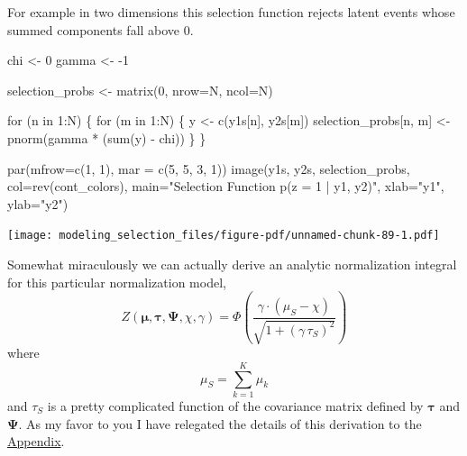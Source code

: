 \documentclass[
  letterpaper,
  DIV=11,
  numbers=noendperiod]{scrartcl}
\newenvironment{Shaded}{\begin{snugshade}}{\end{snugshade}}
\newcommand{\AttributeTok}[1]{\textcolor[rgb]{0.40,0.45,0.13}{#1}}
\newcommand{\ControlFlowTok}[1]{\textcolor[rgb]{0.00,0.23,0.31}{#1}}
\newcommand{\DecValTok}[1]{\textcolor[rgb]{0.68,0.00,0.00}{#1}}
\newcommand{\FunctionTok}[1]{\textcolor[rgb]{0.28,0.35,0.67}{#1}}
\newcommand{\NormalTok}[1]{\textcolor[rgb]{0.00,0.23,0.31}{#1}}
\newcommand{\OtherTok}[1]{\textcolor[rgb]{0.00,0.23,0.31}{#1}}
\newcommand{\SpecialCharTok}[1]{\textcolor[rgb]{0.37,0.37,0.37}{#1}}
\newcommand{\StringTok}[1]{\textcolor[rgb]{0.13,0.47,0.30}{#1}}
\begin{document}
For example in two dimensions this selection function rejects latent
events whose summed components fall above \(0\).

\begin{Shaded}
\begin{Highlighting}[]
\NormalTok{chi }\OtherTok{\textless{}{-}} \DecValTok{0}
\NormalTok{gamma }\OtherTok{\textless{}{-}} \SpecialCharTok{{-}}\DecValTok{1}

\NormalTok{selection\_probs }\OtherTok{\textless{}{-}} \FunctionTok{matrix}\NormalTok{(}\DecValTok{0}\NormalTok{, }\AttributeTok{nrow=}\NormalTok{N, }\AttributeTok{ncol=}\NormalTok{N)}

\ControlFlowTok{for}\NormalTok{ (n }\ControlFlowTok{in} \DecValTok{1}\SpecialCharTok{:}\NormalTok{N) \{}
  \ControlFlowTok{for}\NormalTok{ (m }\ControlFlowTok{in} \DecValTok{1}\SpecialCharTok{:}\NormalTok{N) \{}
\NormalTok{    y }\OtherTok{\textless{}{-}} \FunctionTok{c}\NormalTok{(y1s[n], y2s[m])}
\NormalTok{    selection\_probs[n, m] }\OtherTok{\textless{}{-}} \FunctionTok{pnorm}\NormalTok{(gamma }\SpecialCharTok{*}\NormalTok{ (}\FunctionTok{sum}\NormalTok{(y) }\SpecialCharTok{{-}}\NormalTok{ chi))}
\NormalTok{  \}}
\NormalTok{\}}

\FunctionTok{par}\NormalTok{(}\AttributeTok{mfrow=}\FunctionTok{c}\NormalTok{(}\DecValTok{1}\NormalTok{, }\DecValTok{1}\NormalTok{), }\AttributeTok{mar =} \FunctionTok{c}\NormalTok{(}\DecValTok{5}\NormalTok{, }\DecValTok{5}\NormalTok{, }\DecValTok{3}\NormalTok{, }\DecValTok{1}\NormalTok{))}
\FunctionTok{image}\NormalTok{(y1s, y2s, selection\_probs, }\AttributeTok{col=}\FunctionTok{rev}\NormalTok{(cont\_colors),}
      \AttributeTok{main=}\StringTok{"Selection Function p(z = 1 | y1, y2)"}\NormalTok{,}
      \AttributeTok{xlab=}\StringTok{"y1"}\NormalTok{, }\AttributeTok{ylab=}\StringTok{"y2"}\NormalTok{)}
\end{Highlighting}
\end{Shaded}

\texttt{[image: modeling\_selection\_files/figure-pdf/unnamed-chunk-89-1.pdf]}

Somewhat miraculously we can actually derive an analytic normalization
integral for this particular normalization model, \[
Z(\boldsymbol{\mu}, \boldsymbol{\tau}, \boldsymbol{\Psi}, \chi, \gamma)
=
\Phi \left( \frac{ \gamma \cdot (\mu_{S} - \chi) }
                 { \sqrt{1 + (\gamma \, \tau_{S})^{2}} } \right)
\] where \[
\mu_{S} = \sum_{k = 1}^{K} \mu_{k}
\] and \(\tau_{S}\) is a pretty complicated function of the covariance
matrix defined by \(\boldsymbol{\tau}\) and \(\boldsymbol{\Psi}\). As my
favor to you I have relegated the details of this derivation to the
\href{@sec:appendix_multi}{Appendix}.
\end{document}
